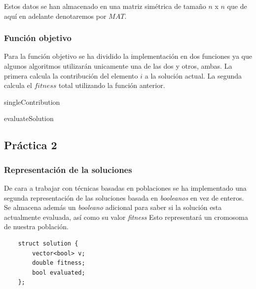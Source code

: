 \documentclass[11pt,a4paper]{article}
\begin{document}
	Estos datos se han almacenado en una matriz simétrica de tamaño $n$ x $n$ que de aquí en adelante denotaremos por $MAT$.
	
	\subsubsection{Función objetivo}
	
	Para la función objetivo se ha dividido la implementación en dos funciones ya que algunos algoritmos utilizarán unicamente una de las dos y otros, ambas. La primera calcula la contribución del elemento $i$ a la solución actual. La segunda calcula el $fitness$ total utilizando la función anterior. \\

	\begin{algorithm}[H]
	\caption{singleContribution}
	\end{algorithm}
			
	\begin{algorithm}[H]
	\caption{evaluateSolution}
	\end{algorithm}

	\subsection{Práctica 2} \label{sec32}
	
	\subsubsection{Representación de la soluciones}
	
	De cara a trabajar con técnicas basadas en poblaciones se ha implementado una segunda representación de las soluciones basada en \emph{booleanos} en vez de enteros. Se almacena además un \emph{booleano} adicional para saber si la solución esta actualmente evaluada, así como su valor \emph{fitness} Esto representará un cromosoma de nuestra población.
	
	\begin{lstlisting}
	struct solution {
		vector<bool> v;
		double fitness;
		bool evaluated;
	};
	\end{lstlisting}
	
\end{document}
